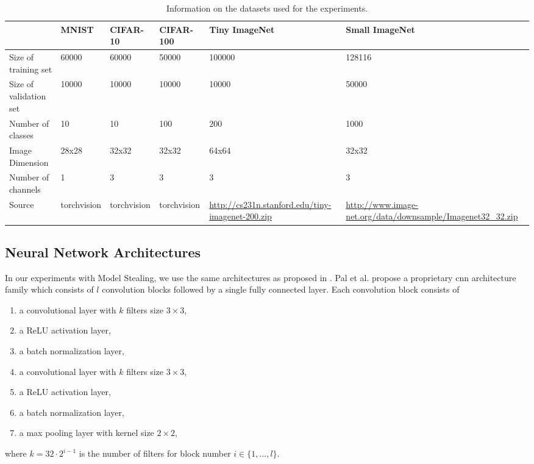 \begin{table}[!htb]
    \centering
    \begin{tabularx}{\textwidth}{|X || X | X | X | X| X|}
        \hline
         & MNIST & CIFAR-10 & CIFAR-100 & Tiny \newline ImageNet & Small \newline ImageNet \\ 
        \hline 
        \hline
        Size of training set & 60000 & 60000& 50000 & 100000 & 128116 \\ 
        \hline
        Size of validation set & 10000 & 10000 & 10000 & 10000 & 50000\\
        \hline
        Number of classes & 10 & 10 & 100 & 200 & 1000 \\
        \hline
        Image Dimension & 28x28 & 32x32 & 32x32 & 64x64& 32x32\\
        \hline
        Number of channels & 1 & 3 & 3 & 3 & 3 \\
        \hline
        Source & torchvision & torchvision & torchvision & {\small \url{http://cs231n.stanford.edu/tiny-imagenet-200.zip}} & {\small \url{http://www.image-net.org/data/downsample/Imagenet32_32.zip}} \\
        \hline
    \end{tabularx}
    \caption{Information on the datasets used for the experiments.}
    \label{fig:DatasetInformtion}
\end{table}

\subsection{Neural Network Architectures}
\label{sec:Appendix:Architectures}
In our experiments with Model Stealing, we use the same architectures as proposed in \cite{pal2020activethief}. Pal et al. propose a proprietary
\gls{cnn} architecture family which consists of $l$ convolution blocks followed by a single fully connected layer. Each convolution block consists
of 
\begin{enumerate}
    \item a convolutional layer with $k$ filters size $3 \times 3$,
    \item a ReLU activation layer,
    \item a batch normalization layer,
    \item a convolutional layer with $k$ filters size $3 \times 3$,
    \item a ReLU activation layer,
    \item a batch normalization layer,
    \item a max pooling layer with kernel size $2 \times 2$,
\end{enumerate}
where $k=32 \cdot 2^{i-1}$ is the number of filters for block number $i \in \{1,\ldots,l\}$.



